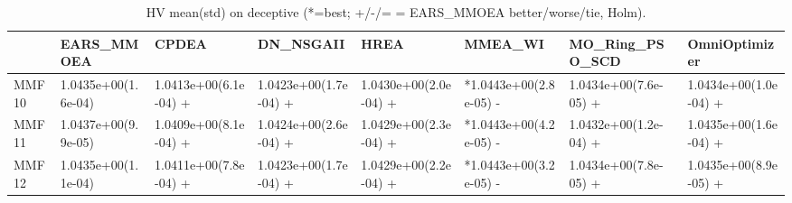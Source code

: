 \begin{table}[t]
\centering
\caption{HV mean(std) on deceptive (*=best; +/-/= = EARS_MMOEA better/worse/tie, Holm).}
\label{tab:deceptive_HV}
\begin{tabular}{llllllll}
\toprule
 & EARS\_MMOEA & CPDEA & DN\_NSGAII & HREA & MMEA\_WI & MO\_Ring\_PSO\_SCD & OmniOptimizer \\
\midrule
MMF10 & 1.0435e+00(1.6e-04) & 1.0413e+00(6.1e-04) + & 1.0423e+00(1.7e-04) + & 1.0430e+00(2.0e-04) + & *1.0443e+00(2.8e-05) - & 1.0434e+00(7.6e-05) + & 1.0434e+00(1.0e-04) + \\
MMF11 & 1.0437e+00(9.9e-05) & 1.0409e+00(8.1e-04) + & 1.0424e+00(2.6e-04) + & 1.0429e+00(2.3e-04) + & *1.0443e+00(4.2e-05) - & 1.0432e+00(1.2e-04) + & 1.0435e+00(1.6e-04) + \\
MMF12 & 1.0435e+00(1.1e-04) & 1.0411e+00(7.8e-04) + & 1.0423e+00(1.7e-04) + & 1.0429e+00(2.2e-04) + & *1.0443e+00(3.2e-05) - & 1.0434e+00(7.8e-05) + & 1.0435e+00(8.9e-05) + \\
\bottomrule
\end{tabular}
\end{table}
